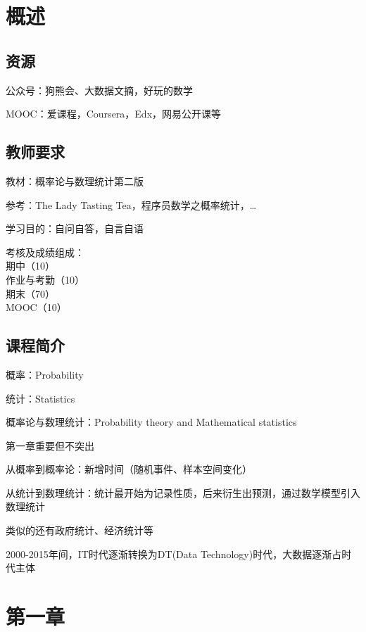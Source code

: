\section*{概述}%
\label{sec:概述}
\subsection*{资源}%
\label{sub:资源}
公众号：狗熊会、大数据文摘，好玩的数学

MOOC：爱课程，Coursera，Edx，网易公开课等

\subsection*{教师要求}%
\label{sub:教师要求}

教材：概率论与数理统计第二版

参考：The Lady Tasting Tea，程序员数学之概率统计，\ldots

学习目的：自问自答，自言自语

考核及成绩组成：\\期中（10）\\作业与考勤（10）\\期末（70）\\MOOC（10）

\subsection*{课程简介}%
\label{sub:课程简介}
概率：Probability

统计：Statistics

概率论与数理统计：Probability theory and Mathematical statistics

\begin{notation}
第一章重要但不突出
\end{notation}
从概率到概率论：新增时间（随机事件、样本空间变化）

从统计到数理统计：统计最开始为记录性质，后来衍生出预测，通过数学模型引入数理统计

类似的还有政府统计、经济统计等

2000-2015年间，IT时代逐渐转换为DT(Data Technology)时代，大数据逐渐占时代主体

{}
\section{第一章}%
\label{sec:第一章}

